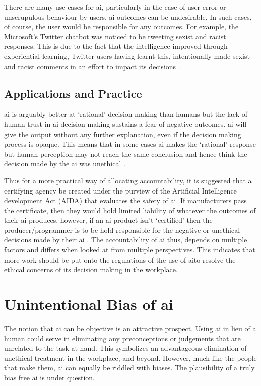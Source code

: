 \documentclass{report}
\begin{document}
There are many use cases for \ac{ai}, particularly in the case of user error or unscrupulous behaviour by users, \ac{ai} outcomes can be undesirable. 
In such cases, of course, the user would be responsible for any outcomes. 
For example, the Microsoft's Twitter chatbot was noticed to be tweeting sexist and racist responses. 
This is due to the fact that the intelligence improved through experiential learning, Twitter users having learnt this, intentionally made sexist and racist comments in an effort to impact its decisions \citep{alaieri2016}.

\subsection{Applications and Practice}
\ac{ai} is arguably better at `rational' decision making than humans but the lack of human trust in \ac{ai} decision making sustains a fear of negative outcomes.
\ac{ai} will give the output without any further explanation, even if the decision making process is opaque. 
This means that in some cases \ac{ai} makes the `rational' response but human perception may not reach the same conclusion and hence think the decision made by the \ac{ai} was unethical \citep{alaieri2016}.

Thus for a more practical way of allocating accountability, it is suggested that a certifying agency be created under the purview of the Artificial Intelligence development Act (AIDA) that evaluates the safety of \ac{ai}. 
If manufacturers pass the certificate, then they would hold limited liability of whatever the outcomes of their \ac{ai} produces, however, if an \ac{ai} product isn't `certified' then the producer/programmer is to be hold responsible for the negative or unethical decisions made by their \ac{ai} \citep{scherer2016}.
The accountability of \ac{ai} thus, depends on multiple factors and differs when looked at from multiple perspectives. 
This indicates that more work should be put onto the regulations of the use of \ac{ai}to resolve the ethical concerns of its decision making in the workplace. 
\section{Unintentional Bias of \ac{ai}}
The notion that \ac{ai} can be objective is an attractive prospect. 
Using \ac{ai} in lieu of a human could serve in eliminating any preconceptions or judgements that are unrelated to the task at hand. 
This symbolizes an advantageous elimination of unethical treatment in the workplace, and beyond. 
However, much like the people that make them, \ac{ai} can equally be riddled with biases. 
The plausibility of a truly bias free \ac{ai} is under question. 
\end{document}
